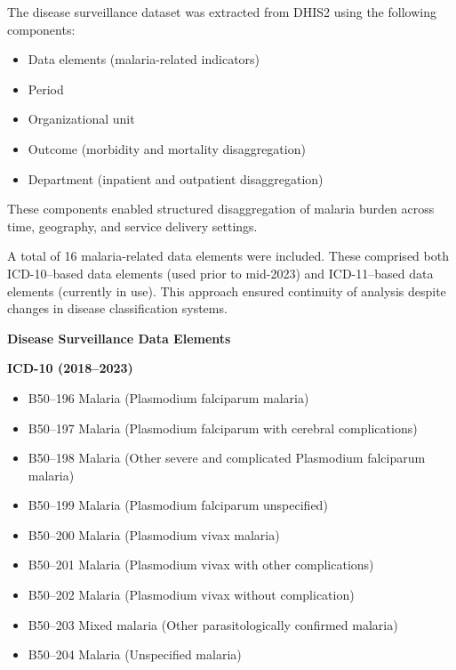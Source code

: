 \documentclass[
  letterpaper,
  DIV=11,
  numbers=noendperiod]{scrartcl}
\providecommand{\tightlist}{%
  \setlength{\itemsep}{0pt}\setlength{\parskip}{0pt}}
\begin{document}
The disease surveillance dataset was extracted from DHIS2 using the
following components:

\begin{itemize}
\tightlist
\item
  Data elements (malaria-related indicators)\\
\item
  Period\\
\item
  Organizational unit\\
\item
  Outcome (morbidity and mortality disaggregation)\\
\item
  Department (inpatient and outpatient disaggregation)
\end{itemize}

These components enabled structured disaggregation of malaria burden
across time, geography, and service delivery settings.

A total of 16 malaria-related data elements were included. These
comprised both ICD-10--based data elements (used prior to mid-2023) and
ICD-11--based data elements (currently in use). This approach ensured
continuity of analysis despite changes in disease classification
systems.

\textbf{Disease Surveillance Data Elements}

\textbf{ICD-10 (2018--2023)}

\begin{itemize}
\tightlist
\item
  B50--196 Malaria (Plasmodium falciparum malaria)\\
\item
  B50--197 Malaria (Plasmodium falciparum with cerebral complications)\\
\item
  B50--198 Malaria (Other severe and complicated Plasmodium falciparum
  malaria)\\
\item
  B50--199 Malaria (Plasmodium falciparum unspecified)\\
\item
  B50--200 Malaria (Plasmodium vivax malaria)\\
\item
  B50--201 Malaria (Plasmodium vivax with other complications)\\
\item
  B50--202 Malaria (Plasmodium vivax without complication)\\
\item
  B50--203 Mixed malaria (Other parasitologically confirmed malaria)\\
\item
  B50--204 Malaria (Unspecified malaria)
\end{itemize}
\end{document}
